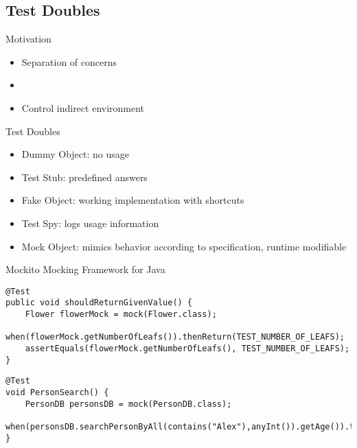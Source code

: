 \subsection{Test Doubles}
\begin{frame}[fragile]{\insertsubsection}
	\begin{fancycolumns}[animation=none]
		\begin{note}{Motivation}
			\begin{itemize}
				\item Separation of concerns
				\item {}
				\item Control indirect environment
			\end{itemize}
		\end{note}\pause
		\begin{definition}{Test Doubles}
			\begin{itemize}
				\item Dummy Object: no usage
				\item Test Stub: predefined answers
				\item Fake Object: working implementation with shortcuts
				\item Test Spy: logs usage information
				\item Mock Object: mimics behavior according to specification, runtime modifiable
			\end{itemize}
		\end{definition}\pause
		\nextcolumn
		\begin{note}{Mockito}%
			Mocking Framework for Java
		\end{note}
		\begin{verbatim}
@Test
public void shouldReturnGivenValue() {
	Flower flowerMock = mock(Flower.class); 
	when(flowerMock.getNumberOfLeafs()).thenReturn(TEST_NUMBER_OF_LEAFS);
	assertEquals(flowerMock.getNumberOfLeafs(), TEST_NUMBER_OF_LEAFS);
}
		\end{verbatim} \vspace{-2mm}
		\begin{verbatim}
@Test
void PersonSearch() {
	PersonDB personsDB = mock(PersonDB.class);
	when(personsDB.searchPersonByAll(contains("Alex"),anyInt()).getAge()).thenReturn(43);
}
		\end{verbatim}
	\end{fancycolumns}
\end{frame}


